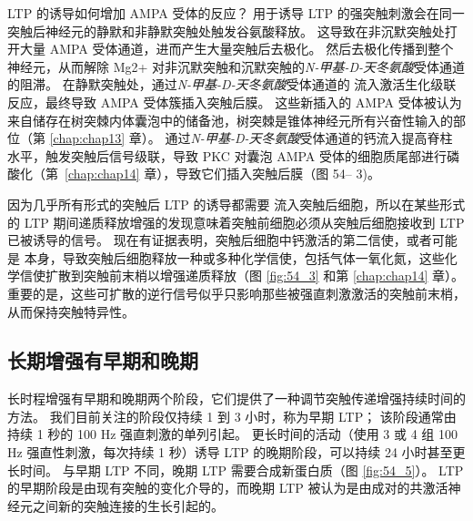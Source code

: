 LTP 的诱导如何增加 AMPA 受体的反应？
用于诱导 LTP 的强突触刺激会在同一突触后神经元的静默和非静默突触处触发谷氨酸释放。
这导致在非沉默突触处打开大量 AMPA 受体通道，进而产生大量突触后去极化。
然后去极化传播到整个神经元，从而解除 Mg2+ 对非沉默突触和沉默突触的\textit{N-甲基-D-天冬氨酸}受体通道的阻滞。
在静默突触处，通过\textit{N-甲基-D-天冬氨酸}受体通道的  流入激活生化级联反应，最终导致 AMPA 受体簇插入突触后膜。
这些新插入的 AMPA 受体被认为来自储存在树突棘内体囊泡中的储备池，树突棘是锥体神经元所有兴奋性输入的部位（第 \ref{chap:chap13} 章）。
通过\textit{N-甲基-D-天冬氨酸}受体通道的钙流入提高脊柱  水平，触发突触后信号级联，导致 PKC 对囊泡 AMPA 受体的细胞质尾部进行磷酸化（第~\ref{chap:chap14} 章），导致它们插入突触后膜（图 54– 3)。


因为几乎所有形式的突触后 LTP 的诱导都需要  流入突触后细胞，所以在某些形式的 LTP 期间递质释放增强的发现意味着突触前细胞必须从突触后细胞接收到 LTP 已被诱导的信号。
现在有证据表明，突触后细胞中钙激活的第二信使，或者可能是  本身，导致突触后细胞释放一种或多种化学信使，包括气体一氧化氮，这些化学信使扩散到突触前末梢以增强递质释放（图 \ref{fig:54_3} 和第 \ref{chap:chap14} 章）。
重要的是，这些可扩散的逆行信号似乎只影响那些被强直刺激激活的突触前末梢，从而保持突触特异性。



\subsection{长期增强有早期和晚期}

长时程增强有早期和晚期两个阶段，它们提供了一种调节突触传递增强持续时间的方法。
我们目前关注的阶段仅持续 1 到 3 小时，称为早期 LTP；
该阶段通常由持续 1 秒的 100 Hz 强直刺激的单列引起。
更长时间的活动（使用 3 或 4 组 100 Hz 强直性刺激，每次持续 1 秒）诱导 LTP 的晚期阶段，可以持续 24 小时甚至更长时间。
与早期 LTP 不同，晚期 LTP 需要合成新蛋白质（图 \ref{fig:54_5}）。
LTP 的早期阶段是由现有突触的变化介导的，而晚期 LTP 被认为是由成对的共激活神经元之间新的突触连接的生长引起的。


